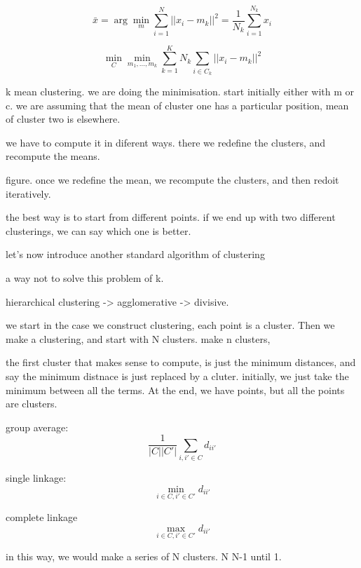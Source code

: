 \documentclass[a4paper]{tufte-book}
\newcommand{\sumin}{\sum_{i=1}^N}
\begin{document}
\begin{equation}
    \bar x = \arg \min_m \sumin || x_i - m_k||^2 = \frac{1}{N_k} \sum_{i=1}^{N_k} x_i
\end{equation}

\begin{equation}
    \min_C \min_{m_1,\ldots,m_k} \sum_{k=1}^K N_k \sum_{i\in C_k} ||x_i - m_k||^2
\end{equation}

k mean clustering.
we are doing the minimisation. start initially either with m or c.
we are assuming that the mean of cluster one has a particular position, mean
of cluster two is elsewhere.

we have to compute it in diferent ways. there we redefine the clusters, and recompute the means.

figure. once we redefine the mean, we recompute the clusters, and then redoit
iteratively.

the best way is to start from different points.
if we end up with two different clusterings, we can say which one is better.

let's now introduce another standard algorithm of clustering

a way not to solve this problem of k.

hierarchical clustering -> agglomerative
                        -> divisive.

we start in the case we construct clustering, each point is a cluster.
Then we make a clustering, and start with N clusters. make n clusters,

the first cluster that makes sense to compute, is just the minimum distances,
and say the minimum distnace is just replaced by a cluter.
initially, we just take the minimum between all the terms. At the end, we have
points, but all the points are clusters.


group average:
\begin{equation}
    \frac{1}{|C||C'|} \sum_{i,i' \in C} d_{ii'}
\end{equation}

single linkage:
\begin{equation}
    \min_{i\in C, i' \in C'} d_{ii'}
\end{equation}

complete linkage
\begin{equation}
    \max_{i \in C, i' \in C'} d_{ii'}
\end{equation}

in this way, we would make a series of N clusters.
N \rightarrow N-1 \rightarrow  until 1.
\end{document}

